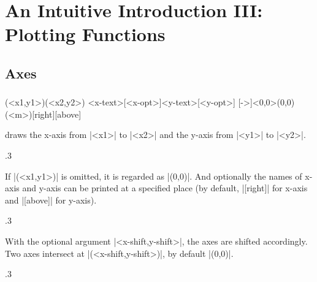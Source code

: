 \chapter{An Intuitive Introduction III: Plotting Functions}
\label{ci:introIII}


\section{Axes}
\label{si:axes}

\subsection{\protect\cmd{\tzaxes}}
\label{ssi:tzaxes}

\begin{tzdef}{}
(<x1,y1>)(<x2,y2>)
                               {<x-text>}[<x-opt>]{<y-text>}[<y-opt>]
  [->]<0,0>(0,0)(<m>){}[right]{}[above]
\end{tzdef}

\icmd{\tzaxes} draws the x-axis from |<x1>| to |<x2>| and the y-axis from |<y1>| to |<y2>|.

\begin{tzcode}{.3}
\end{tzcode}

If |(<x1,y1>)| is omitted, it is regarded as |(0,0)|.
And optionally the names of x-axis and y-axis can be printed at a specified place (by default, |[right]| for x-axis and |[above]| for y-axis).

\begin{tzcode}{.3}
\end{tzcode}

With the optional argument |<x-shift,y-shift>|, the axes are shifted accordingly. Two axes intersect at |(<x-shift,y-shift>)|, by default |(0,0)|.

\begin{tzcode}{.3}
\end{tzcode}

